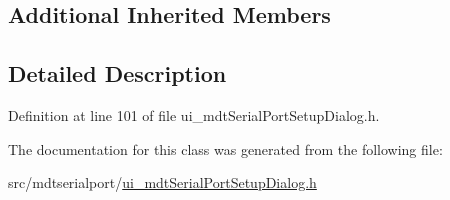 \subsection*{Additional Inherited Members}


\subsection{Detailed Description}


Definition at line 101 of file ui\-\_\-mdt\-Serial\-Port\-Setup\-Dialog.\-h.



The documentation for this class was generated from the following file\-:\begin{DoxyCompactItemize}
\item 
src/mdtserialport/\hyperlink{ui__mdt_serial_port_setup_dialog_8h}{ui\-\_\-mdt\-Serial\-Port\-Setup\-Dialog.\-h}\end{DoxyCompactItemize}
